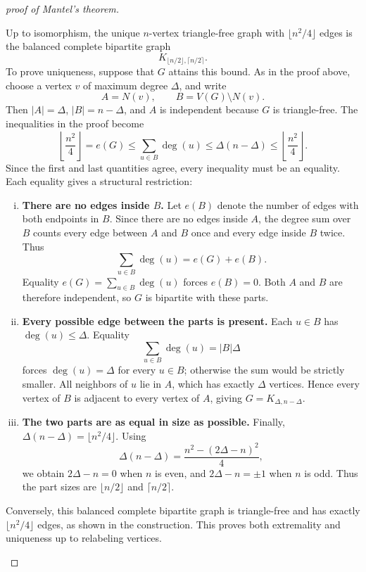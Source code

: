 \begin{proof}[proof of Mantel's theorem]
    \begin{remark}
        Up to isomorphism, the unique \(n\)-vertex triangle-free graph with \(\lfloor n^2/4\rfloor\) edges is the balanced complete bipartite graph
        \[
            K_{\lfloor n/2\rfloor,\lceil n/2\rceil}.
        \]
        To prove uniqueness, suppose that \(G\) attains this bound. As in the proof above, choose a vertex \(v\) of maximum degree \(\Delta\), and write
        \[
            A=N(v),\qquad B=V(G)\setminus N(v).
        \]
        Then \(|A|=\Delta\), \(|B|=n-\Delta\), and \(A\) is independent because \(G\) is triangle-free. The inequalities in the proof become
        \[
            \left\lfloor\frac{n^2}{4}\right\rfloor
            =e(G)\le \sum_{u\in B}\deg(u)
            \le \Delta(n-\Delta)
            \le \left\lfloor\frac{n^2}{4}\right\rfloor.
        \]
        Since the first and last quantities agree, every inequality must be an equality. Each equality gives a structural restriction:
        \begin{enumerate}[(i)]
            \item \textbf{There are no edges inside \(B\).}
            Let \(e(B)\) denote the number of edges with both endpoints in \(B\). Since there are no edges inside \(A\), the degree sum over \(B\) counts every edge between \(A\) and \(B\) once and every edge inside \(B\) twice. Thus
            \[
                \sum_{u\in B}\deg(u)=e(G)+e(B).
            \]
            Equality \(e(G)=\sum_{u\in B}\deg(u)\) forces \(e(B)=0\). Both \(A\) and \(B\) are therefore independent, so \(G\) is bipartite with these parts.

            \item \textbf{Every possible edge between the parts is present.}
            Each \(u\in B\) has \(\deg(u)\le\Delta\). Equality
            \[
                \sum_{u\in B}\deg(u)=|B|\Delta
            \]
            forces \(\deg(u)=\Delta\) for every \(u\in B\); otherwise the sum would be strictly smaller. All neighbors of \(u\) lie in \(A\), which has exactly \(\Delta\) vertices. Hence every vertex of \(B\) is adjacent to every vertex of \(A\), giving \(G=K_{\Delta,n-\Delta}\).

            \item \textbf{The two parts are as equal in size as possible.}
            Finally, \(\Delta(n-\Delta)=\lfloor n^2/4\rfloor\). Using
            \[
                \Delta(n-\Delta)=\frac{n^2-(2\Delta-n)^2}{4},
            \]
            we obtain \(2\Delta-n=0\) when \(n\) is even, and \(2\Delta-n=\pm1\) when \(n\) is odd. Thus the part sizes are \(\lfloor n/2\rfloor\) and \(\lceil n/2\rceil\).
        \end{enumerate}
        Conversely, this balanced complete bipartite graph is triangle-free and has exactly \(\lfloor n^2/4\rfloor\) edges, as shown in the construction. This proves both extremality and uniqueness up to relabeling vertices.
    \end{remark}
\end{proof}

